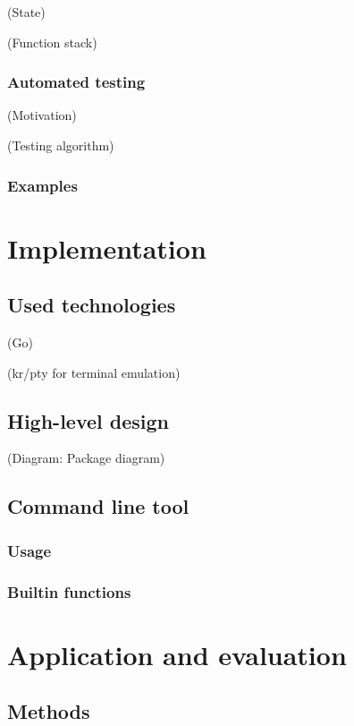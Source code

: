 \documentclass[twoside]{scrreprt}
\begin{document}
                (State)

                (Function stack)

\subsection{Automated testing}

                (Motivation)

                (Testing algorithm)

\subsection{Examples}

\chapter{Implementation}

\section{Used technologies}

            (Go)

            (kr/pty for terminal emulation)

\section{High-level design}

            (Diagram: Package diagram)

\section{Command line tool}

\subsection{Usage}

\subsection{Builtin functions}

\chapter{Application and evaluation}

\section{Methods}
\end{document}
